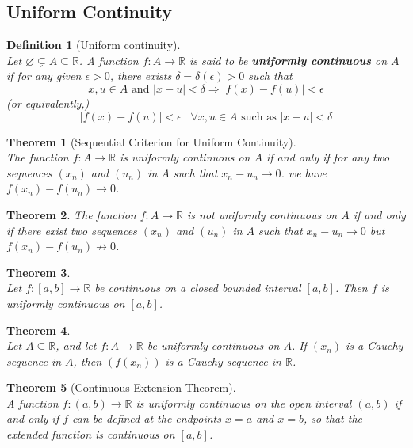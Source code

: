 \documentclass[8pt]{article}
\newtheorem{definition}{Definition}[section]
\newtheorem{theorem}{Theorem}[section]
\theoremstyle{definition}
\begin{document}
\subsection{Uniform Continuity}
\begin{definition}[Uniform continuity]
\hfill\\\normalfont Let $\varnothing\subsetneq A\subseteq \mathbb{R}$. A function $f:A\to \mathbb{R}$ is said to be \textbf{uniformly continuous} on $A$ if for any given $\epsilon>0$, there exists $\delta = \delta(\epsilon)>0$ such that
\[
x,u\in A\text{ and }|x-u|<\delta\Rightarrow |f(x)-f(u)|<\epsilon
\]
(or equivalently,)
\[
|f(x)-f(u)|<\epsilon \;\;\;\forall x,u\in A\text{ such as }|x-u|<\delta
\]
\end{definition}
\begin{theorem}[Sequential Criterion for Uniform Continuity]
\hfill\\\normalfont The function $f:A\to\mathbb{R}$ is uniformly continuous on $A$ if and only if for any two sequences $(x_n)$ and $(u_n)$ in $A$ such that $x_n-u_n\to 0$. we have $f(x_n)-f(u_n)\to 0$.
\end{theorem}
\begin{theorem}\normalfont The function $f:A\to\mathbb{R}$ is not uniformly continuous on $A$ if and only if there exist two sequences $(x_n)$ and $(u_n)$ in $A$ such that $x_n-u_n\to 0$ but $f(x_n)-f(u_n)\not\to 0$.
\end{theorem}
\begin{theorem}
\hfill\\\normalfont Let $f:[a,b]\to\mathbb{R}$ be continuous on a closed bounded interval $[a,b]$. Then $f$ is uniformly continuous on $[a,b]$.
\end{theorem}
\begin{theorem}
\hfill\\\normalfont Let $A\subseteq\mathbb{R}$, and let $f:A\to\mathbb{R}$ be uniformly continuous on $A$. If $(x_n)$ is a Cauchy sequence in $A$, then $(f(x_n))$ is a Cauchy sequence in $\mathbb{R}$.
\end{theorem}
\begin{theorem}[Continuous Extension Theorem]
\hfill\\\normalfont A function $f:(a,b)\to\mathbb{R}$ is uniformly continuous on the open interval $(a,b)$ if and only if $f$ can be defined at the endpoints $x=a$ and $x=b$, so that the extended function is continuous on $[a,b]$.
\end{theorem}
\end{document}

